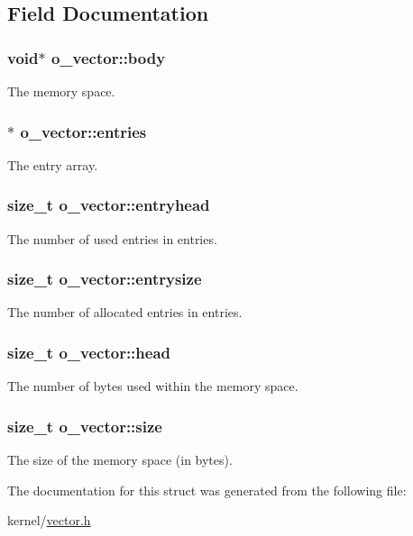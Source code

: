 \subsection{Field Documentation}
\hypertarget{structo__vector_a0aca2da3dc9eeab18d0bad8b04c2bcb9}{
\subsubsection[{body}]{\setlength{\rightskip}{0pt plus 5cm}void$\ast$ o\-\_\-vector\-::body}}\label{structo__vector_a0aca2da3dc9eeab18d0bad8b04c2bcb9}
The memory space. \hypertarget{structo__vector_a5620bad6792e745bbd7748eb573b46cf}{
\subsubsection[{entries}]{$\ast$ o\-\_\-vector\-::entries}}\label{structo__vector_a5620bad6792e745bbd7748eb573b46cf}
The entry array. \hypertarget{structo__vector_ad1219a8e6f11e3e86fce2335f547d92a}{
\subsubsection[{entryhead}]{\setlength{\rightskip}{0pt plus 5cm}size\-\_\-t o\-\_\-vector\-::entryhead}}\label{structo__vector_ad1219a8e6f11e3e86fce2335f547d92a}
The number of used entries in entries. \hypertarget{structo__vector_a6084c0adf02069de9e78ae01e9b9d31d}{
\subsubsection[{entrysize}]{\setlength{\rightskip}{0pt plus 5cm}size\-\_\-t o\-\_\-vector\-::entrysize}}\label{structo__vector_a6084c0adf02069de9e78ae01e9b9d31d}
The number of allocated entries in entries. \hypertarget{structo__vector_ae2e1b8deee911c2e19c9371426ea3a34}{
\subsubsection[{head}]{\setlength{\rightskip}{0pt plus 5cm}size\-\_\-t o\-\_\-vector\-::head}}\label{structo__vector_ae2e1b8deee911c2e19c9371426ea3a34}
The number of bytes used within the memory space. \hypertarget{structo__vector_a0d1fd9fad9798e2368ae2627ab01d369}{
\subsubsection[{size}]{\setlength{\rightskip}{0pt plus 5cm}size\-\_\-t o\-\_\-vector\-::size}}\label{structo__vector_a0d1fd9fad9798e2368ae2627ab01d369}
The size of the memory space (in bytes). 

The documentation for this struct was generated from the following file\-:\begin{DoxyCompactItemize}
\item 
kernel/\hyperlink{vector_8h}{vector.\-h}\end{DoxyCompactItemize}
